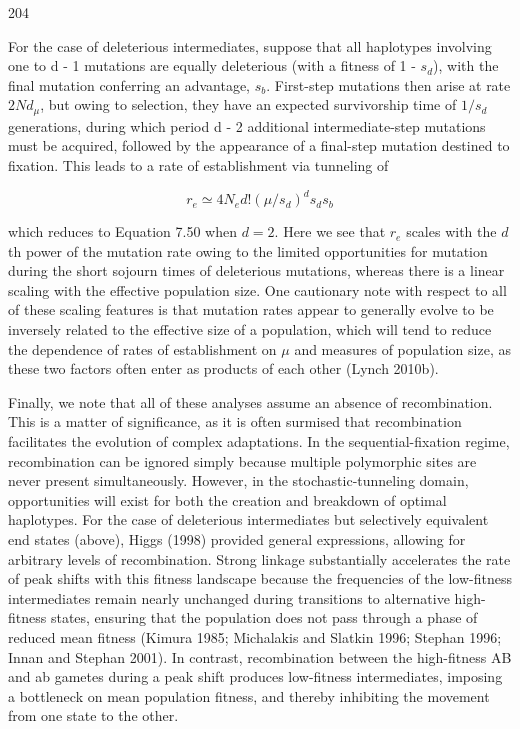 \documentclass{article}
\begin{document}
204

For the case of deleterious intermediates, suppose that all haplotypes involving one to d - 1 mutations are equally deleterious (with a fitness of 1 -  $ s_d $), with the final mutation conferring an advantage,  $ s_b $. First-step mutations then arise at rate  $ 2N d_\mu $, but owing to selection, they have an expected survivorship time of  $ 1/s_d $ generations, during which period d - 2 additional intermediate-step mutations must be acquired, followed by the appearance of a final-step mutation destined to fixation. This leads to a rate of establishment via tunneling of

\begin{equation}
r_{e}\simeq4N_{e}d!(\mu/s_{d})^{d}s_{d}s_{b}
\tag{7.54}
\label{eq:7_54}
\end{equation}

which reduces to Equation 7.50 when $d = 2$. Here we see that $r_{e}$ scales with the $d$th power of the mutation rate owing to the limited opportunities for mutation during the short sojourn times of deleterious mutations, whereas there is a linear scaling with the effective population size. One cautionary note with respect to all of these scaling features is that mutation rates appear to generally evolve to be inversely related to the effective size of a population, which will tend to reduce the dependence of rates of establishment on $\mu$ and measures of population size, as these two factors often enter as products of each other (Lynch 2010b).

Finally, we note that all of these analyses assume an absence of recombination. This is a matter of significance, as it is often surmised that recombination facilitates the evolution of complex adaptations. In the sequential-fixation regime, recombination can be ignored simply because multiple polymorphic sites are never present simultaneously. However, in the stochastic-tunneling domain, opportunities will exist for both the creation and breakdown of optimal haplotypes. For the case of deleterious intermediates but selectively equivalent end states (above), Higgs (1998) provided general expressions, allowing for arbitrary levels of recombination. Strong linkage substantially accelerates the rate of peak shifts with this fitness landscape because the frequencies of the low-fitness intermediates remain nearly unchanged during transitions to alternative high-fitness states, ensuring that the population does not pass through a phase of reduced mean fitness (Kimura 1985; Michalakis and Slatkin 1996; Stephan 1996; Innan and Stephan 2001). In contrast, recombination between the high-fitness AB and ab gametes during a peak shift produces low-fitness intermediates, imposing a bottleneck on mean population fitness, and thereby inhibiting the movement from one state to the other.
\end{document}
